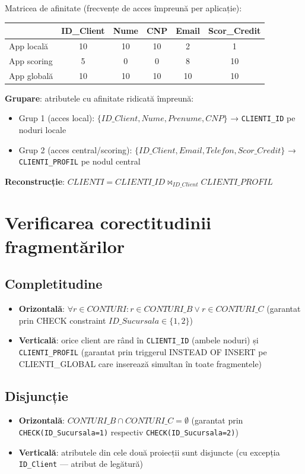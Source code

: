 \documentclass[12pt,a4paper]{article}
\begin{document}
Matricea de afinitate (frecvențe de acces împreună per aplicație):

\begin{center}
\begin{tabular}{l|ccccc}
\toprule
 & ID\_Client & Nume & CNP & Email & Scor\_Credit \\
\midrule
App locală & 10 & 10 & 10 & 2 & 1 \\
App scoring & 5 & 0 & 0 & 8 & 10 \\
App globală & 10 & 10 & 10 & 10 & 10 \\
\bottomrule
\end{tabular}
\end{center}

\textbf{Grupare}: atributele cu afinitate ridicată împreună:
\begin{itemize}
  \item Grup 1 (acces local): $\{ID\_Client, Nume, Prenume, CNP\}$ → \texttt{CLIENTI\_ID} pe noduri locale
  \item Grup 2 (acces central/scoring): $\{ID\_Client, Email, Telefon, Scor\_Credit\}$ → \texttt{CLIENTI\_PROFIL} pe nodul central
\end{itemize}

\textbf{Reconstrucție}: $CLIENTI = CLIENTI\_ID \bowtie_{ID\_Client} CLIENTI\_PROFIL$

\section{Verificarea corectitudinii fragmentărilor}

\subsection{Completitudine}
\begin{itemize}
  \item \textbf{Orizontală}: $\forall r \in CONTURI: r \in CONTURI\_B \lor r \in CONTURI\_C$
    (garantat prin CHECK constraint $ID\_Sucursala \in \{1,2\}$)
  \item \textbf{Verticală}: orice client are rând în \texttt{CLIENTI\_ID} (ambele noduri) și \texttt{CLIENTI\_PROFIL}
    (garantat prin triggerul INSTEAD OF INSERT pe CLIENTI\_GLOBAL care inserează simultan în toate fragmentele)
\end{itemize}

\subsection{Disjuncție}
\begin{itemize}
  \item \textbf{Orizontală}: $CONTURI\_B \cap CONTURI\_C = \emptyset$
    (garantat prin \texttt{CHECK(ID\_Sucursala=1)} respectiv \texttt{CHECK(ID\_Sucursala=2)})
  \item \textbf{Verticală}: atributele din cele două proiecții sunt disjuncte
    (cu excepția \texttt{ID\_Client} — atribut de legătură)
\end{itemize}
\end{document}
